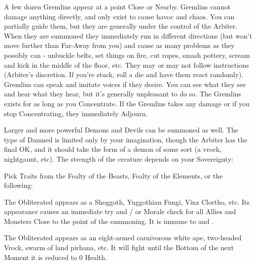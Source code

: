 \begin{multicols*}{2}
 A few dozen Gremlins appear at a point Close or Nearby. Gremlins cannot damage anything directly, and only exist to cause havoc and chaos. You can partially guide them, but they are generally under the control of the Arbiter. When they are summoned they immediately run in different directions (but won't move further than Far-Away from you) and cause as many problems as they possibly can - unbuckle belts, set things on fire, cut ropes, smash pottery, scream and kick in the middle of the floor, etc.  They may or may not follow instructions (Arbiter's discretion.  If you're stuck, roll a die and have them react randomly). Gremlins can speak and imitate voices if they desire. You can see what they see and hear what they hear, but it's generally unpleasant to do so. The Gremlins exists for as long as you Concentrate. If the Gremlins takes any damage or if you stop Concentrating, they immediately Adjourn.


 Larger and more powerful Demons and Devils can be summoned as well. The type of Damned is limited only by your imagination, though the Arbiter has the final OK, and it should take the form of a demon of some sort (a vrock, nightgaunt, etc). The strength of the creature depends on your \MAX Sovereignty:


Pick  Traits from the Fealty of the  Beasts, Fealty of the Elements, or the following:

 The Obliterated appears as a Shoggoth, Yuggothian Fungi, Vinz Clortho, etc. Its appearance causes an immediate  try and / or Morale check for all Allies and Monsters Close to the point of the summoning. It is immune to  and .

 The Obliterated appears as an eight-armed carnivorous white ape, two-headed Vrock, swarm of land pirhana, etc. It will fight until the Bottom of the next Moment  it is reduced to 0 Health.


\end{multicols*}
